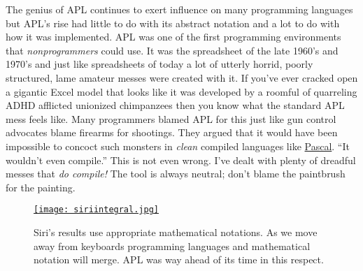 

The genius of APL continues to exert influence on many programming
languages but APL's rise had little to do with its abstract notation and
a lot to do with how it was implemented. APL was one of the first
programming environments that \emph{nonprogrammers} could use. It was
the spreadsheet of the late 1960's and 1970's and just like spreadsheets
of today a lot of utterly horrid, poorly structured, lame amateur messes
were created with it. If you've ever cracked open a gigantic Excel model
that looks like it was developed by a roomful of quarreling ADHD
afflicted unionized chimpanzees then you know what the standard APL mess
feels like. Many programmers blamed APL for this just like gun control
advocates blame firearms for shootings. They argued that it would have
been impossible to concoct such monsters in \emph{clean} compiled
languages like
\href{https://en.wikipedia.org/wiki/Pascal\_(programming\_language)}{Pascal}.
``It wouldn't even compile.'' This is not even wrong. I've dealt with
plenty of dreadful messes that \emph{do compile!} The tool is always
neutral; don't blame the paintbrush for the painting.

\captionsetup[figure]{labelformat=empty}
\begin{SCfigure}
\centering
\href{http://bakerjd99.wordpress.com/2013/12/26/apl-software-archaeology-dbi-edition/siriintegral/}{\texttt{[image: siriintegral.jpg]}}
\caption{Siri's results use appropriate mathematical notations. As we move away
from keyboards programming languages and mathematical notation will
merge. APL was way ahead of its time in this respect.}
\label{fig:4415X1}
\end{SCfigure}

